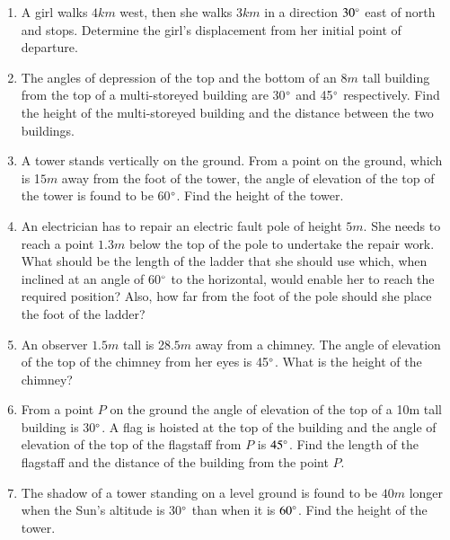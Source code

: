\begin{enumerate}[label=\thesubsection.\arabic*.,ref=\thesubsection.\theenumi]
\item A girl walks $4km$ west, then she walks $3km$ in a direction $30\degree$ east of north and stops.  Determine the girl's displacement from her initial point of departure.
\item The angles of depression of the top and the bottom of an $8m$ tall building from the top of a multi-storeyed building are 30$\degree$ and 45$\degree$ respectively.  Find the height of the multi-storeyed building and the distance between the two buildings.
\item A tower stands vertically on the ground.  From a point on the ground, which is 1$5m$ away from the foot of the tower, the angle of elevation of the top of the tower is found to be 60$\degree$.  Find the height of the tower.
\item An electrician has to repair an electric fault pole of height $5m$.  She needs to reach a point $1.3m$ below the top of the pole to undertake the repair work.  What should be the length of the ladder that she should use which, when inclined at an angle of 60$\degree$ to the horizontal, would enable her to reach the required position?  Also, how far from the foot of the pole should she place the foot of the ladder?
\item An observer $1.5m$ tall is 28.$5m$ away from a chimney.  The angle of elevation of the top of the chimney from her eyes is 45$\degree$.  What is the height of the chimney?
\item From a point ${P}$ on the ground the angle of elevation of the top of a 10m tall building is 30$\degree$.  A flag is hoisted at the top of the building and the angle of elevation of the top of the flagstaff from ${P}$ is $45\degree$.  Find the length of the flagstaff and the distance of the building from the point ${P}$.
\item The shadow of a tower standing on a level ground is found to be $40m$ longer when the Sun's altitude is 30$\degree$ than when it is $60\degree$.  Find the height of the tower.
\end{enumerate}
